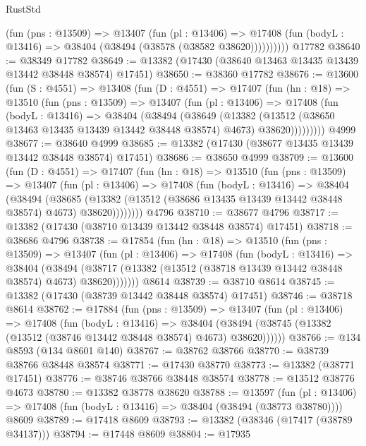 \begin{lexlean}{RustStd}
\begin{coremodule}
            (fun (pns : @13509) =>
            @13407
              (fun (pl : @13406) =>
              @17408 (fun (bodyL : @13416) => @38404 (@38494 (@38578 (@38582 @38620))))))))))
    @17782
@38640 := @38349 @17782
@38649 := @13382 (@17430 (@38640 @13463 @13435 @13439 @13442 @38448 @38574) @17451)
@38650 := @38360 @17782
@38676 := @13600
    (fun (S : @4551) =>
    @13408
      (fun (D : @4551) =>
      @17407
        (fun (hn : @18) =>
        @13510
          (fun (pns : @13509) =>
          @13407
            (fun (pl : @13406) =>
            @17408
              (fun (bodyL : @13416) =>
              @38404
                (@38494
                  (@38649
                    (@13382
                      (@13512 (@38650 @13463 @13435 @13439 @13442 @38448 @38574) @4673)
                      @38620)))))))))
    @4999
@38677 := @38640 @4999
@38685 := @13382 (@17430 (@38677 @13435 @13439 @13442 @38448 @38574) @17451)
@38686 := @38650 @4999
@38709 := @13600
    (fun (D : @4551) =>
    @17407
      (fun (hn : @18) =>
      @13510
        (fun (pns : @13509) =>
        @13407
          (fun (pl : @13406) =>
          @17408
            (fun (bodyL : @13416) =>
            @38404
              (@38494
                (@38685
                  (@13382 (@13512 (@38686 @13435 @13439 @13442 @38448 @38574) @4673) @38620))))))))
    @4796
@38710 := @38677 @4796
@38717 := @13382 (@17430 (@38710 @13439 @13442 @38448 @38574) @17451)
@38718 := @38686 @4796
@38738 := @17854
    (fun (hn : @18) =>
    @13510
      (fun (pns : @13509) =>
      @13407
        (fun (pl : @13406) =>
        @17408
          (fun (bodyL : @13416) =>
          @38404
            (@38494
              (@38717 (@13382 (@13512 (@38718 @13439 @13442 @38448 @38574) @4673) @38620)))))))
    @8614
@38739 := @38710 @8614
@38745 := @13382 (@17430 (@38739 @13442 @38448 @38574) @17451)
@38746 := @38718 @8614
@38762 := @17884
    (fun (pns : @13509) =>
    @13407
      (fun (pl : @13406) =>
      @17408
        (fun (bodyL : @13416) =>
        @38404 (@38494 (@38745 (@13382 (@13512 (@38746 @13442 @38448 @38574) @4673) @38620))))))
@38766 := @134 @8593 (@134 @8601 @140)
@38767 := @38762 @38766
@38770 := @38739 @38766 @38448 @38574
@38771 := @17430 @38770
@38773 := @13382 (@38771 @17451)
@38776 := @38746 @38766 @38448 @38574
@38778 := @13512 @38776 @4673
@38780 := @13382 @38778 @38620
@38788 := @13597
    (fun (pl : @13406) => @17408 (fun (bodyL : @13416) => @38404 (@38494 (@38773 @38780))))
    @8609
@38789 := @17418 @8609
@38793 := @13382 (@38346 (@17417 (@38789 @34137)))
@38794 := @17448 @8609
@38804 := @17935

\end{coremodule}
\end{lexlean}
